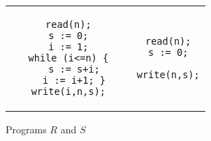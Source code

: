 \documentclass[prodmode,acmtocl]{acmsmall}
\def\progr{\ensuremath{R}\xspace}
\def\progss{\ensuremath{S}\xspace}
\newcommand{\0}{\mbox{\bf 0}}
\begin{document}
\begin{figure}
  \begin{center}
    \begin{tabular}[t]{c@{\quad}|@{\quad}c}
      \begin{lstlisting}
   read(n);
   s := 0;
   i := 1;
   while (i<=n) {
     s := s+i;
     i := i+1; }
   write(i,n,s);
      \end{lstlisting}
      &
      \begin{lstlisting}
   read(n);
   s := 0;
   
   write(n,s);
      \end{lstlisting}
    \end{tabular}
  \end{center}
  \caption{Programs \progr and \progss}\label{fig:RandS}
\end{figure}
\end{document}
